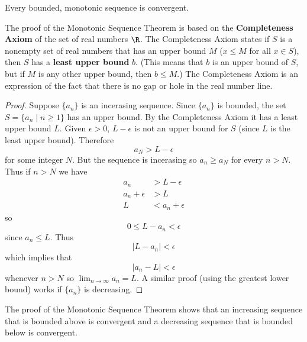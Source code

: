 \begin{theorem}
    Every bounded, monotonic sequence is convergent.
\end{theorem}
The proof of the Monotonic Sequence Theorem is based on the
\textbf{Completeness Axiom} of the set of real numbers \(\R\).
The Completeness Axiom states if \(S\) is a nonempty set of real numbers that
has an upper bound \(M\) (\(x\leq M\) for all \(x\in S\)), then \(S\) has a
\textbf{least upper bound} \(b\).
(This means that \(b\) is an upper bound of \(S\),
but if \(M\) is any other upper bound, then \(b\leq M\).)
The Completeness Axiom is an expression of the fact that there is no gap or
hole in the real number line.
\begin{proof}
    Suppose \(\{a_n\}\) is an incerasing sequence.
    Since \(\{a_n\}\) is bounded, the set \\ \(S=\{a_n\mid n\geq 1\}\) has an
    upper bound.
    By the Completeness Axiom it has a least upper bound \(L\).
    Given \(\epsilon>0\), \(L-\epsilon\) is not an upper bound for \(S\)
    (since \(L\) is the least upper bound).
    Therefore
    \[a_N>L-\epsilon\]
    for some integer \(N\).
    But the sequence is incerasing so \(a_n\geq a_N\) for every \(n>N\).
    Thus if \(n>N\) we have
    \begin{align*}
        a_n &> L-\epsilon \\
        a_n+\epsilon &> L \\
        L &< a_n +\epsilon
    \end{align*}
    so
    \[0\leq L-a_n<\epsilon\]
    since \(a_n\leq L\).
    Thus
    \[|L-a_n|<\epsilon\]
    which implies that
    \[|a_n-L|<\epsilon\]
    whenever \(n>N\) so \(\displaystyle{\lim_{n\to\infty}a_n=L}\).
    A similar proof (using the greatest lower bound) works if \(\{a_n\}\) is
    decreasing.
\end{proof}
The proof of the Monotonic Sequence Theorem shows that an increasing sequence
that is bounded above is convergent and a decreasing sequence that is bounded
below is convergent.